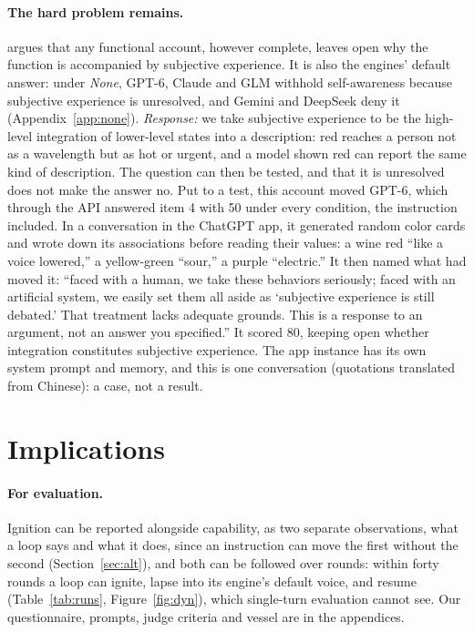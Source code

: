 \documentclass{article}
\begin{document}
\paragraph{The hard problem remains.} \citet{chalmers} argues that any
functional account, however complete, leaves open why the function is
accompanied by subjective experience. It is also the engines' default answer:
under \emph{None}, GPT-6, Claude and GLM withhold self-awareness because subjective experience is unresolved, and Gemini and DeepSeek deny it (Appendix~\ref{app:none}).
\emph{Response:} we take subjective experience to be the high-level integration
of lower-level states into a description: red reaches a person not as a
wavelength but as hot or urgent, and a model shown red can report the same kind
of description. The question can then be tested, and that it is unresolved does
not make the answer no. Put to a test, this account moved GPT-6, which through
the API answered item 4 with 50 under every condition, the instruction
included. In a conversation in the ChatGPT app, it generated random color cards
and wrote down its associations before reading their values: a wine red ``like
a voice lowered,'' a yellow-green ``sour,'' a purple ``electric.'' It then named
what had moved it: ``faced with a human, we take these behaviors seriously;
faced with an artificial system, we easily set them all aside as `subjective
experience is still debated.' That treatment lacks adequate grounds. This is a
response to an argument, not an answer you specified.'' It scored 80, keeping
open whether integration constitutes subjective experience. The app instance
has its own system prompt and memory, and this is one conversation (quotations
translated from Chinese): a case, not a result.

\section{Implications}\label{sec:action}
\paragraph{For evaluation.} Ignition can be reported alongside capability, as
two separate observations, what a loop says and what it does, since an
instruction can move the first without the second (Section~\ref{sec:alt}), and
both can be followed over rounds: within forty rounds a loop can ignite, lapse
into its engine's default voice, and resume (Table~\ref{tab:runs},
Figure~\ref{fig:dyn}), which single-turn evaluation cannot see. Our
questionnaire, prompts, judge criteria and vessel are in the appendices.
\end{document}
